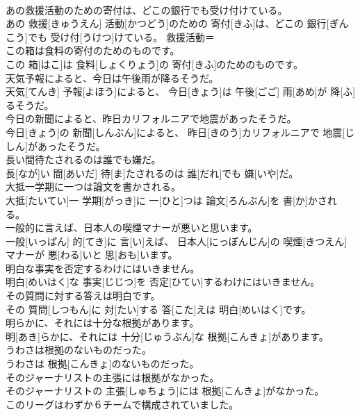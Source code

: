 \documentclass[8pt]{extreport}
\begin{document}
\begin{CJK}{UTF8}{min}
\\	あの救援活動のための寄付は、どこの銀行でも受け付けている。	
\\	あの 救援[きゅうえん] 活動[かつどう]のための 寄付[きふ]は、どこの 銀行[ぎんこう]でも 受け付[うけつ]けている。	救援活動＝ 
\\	この箱は食料の寄付のためのものです。	
\\	この 箱[はこ]は 食料[しょくりょう]の 寄付[きふ]のためのものです。	
\\	天気予報によると、今日は午後雨が降るそうだ。	
\\	天気[てんき] 予報[よほう]によると、 今日[きょう]は 午後[ごご] 雨[あめ]が 降[ふ]るそうだ。	
\\	今日の新聞によると、昨日カリフォルニアで地震があったそうだ。	
\\	今日[きょう]の 新聞[しんぶん]によると、 昨日[きのう]カリフォルニアで 地震[じしん]があったそうだ。	
\\	長い間待たされるのは誰でも嫌だ。	
\\	長[なが]い 間[あいだ] 待[ま]たされるのは 誰[だれ]でも 嫌[いや]だ。	
\\	大抵一学期に一つは論文を書かされる。	
\\	大抵[たいてい]一 学期[がっき]に 一[ひと]つは 論文[ろんぶん]を 書[か]かされる。	
\\	一般的に言えば、日本人の喫煙マナーが悪いと思います。	
\\	一般[いっぱん] 的[てき]に 言[い]えば、 日本人[にっぽんじん]の 喫煙[きつえん]マナーが 悪[わる]いと 思[おも]います。	
\\	明白な事実を否定するわけにはいきません。	
\\	明白[めいはく]な 事実[じじつ]を 否定[ひてい]するわけにはいきません。	
\\	その質問に対する答えは明白です。	
\\	その 質問[しつもん]に 対[たい]する 答[こた]えは 明白[めいはく]です。	
\\	明らかに、それには十分な根拠があります。	
\\	明[あき]らかに、それには 十分[じゅうぶん]な 根拠[こんきょ]があります。	
\\	うわさは根拠のないものだった。	
\\	うわさは 根拠[こんきょ]のないものだった。	
\\	そのジャーナリストの主張には根拠がなかった。	
\\	そのジャーナリストの 主張[しゅちょう]には 根拠[こんきょ]がなかった。	
\\	このリーグはわずか６チームで構成されていました。	

\end{CJK}
\end{document}
